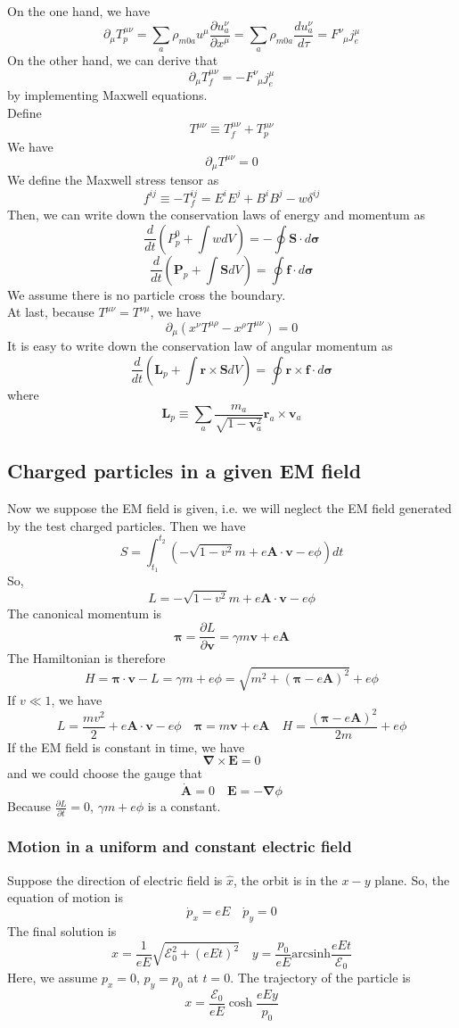 On the one hand, we have
\[\partial_{\mu} T_p^{\mu\nu} = \sum_a \rho_{m0a}u^{\mu} \frac{\partial u_a^{\nu}}{\partial x^{\mu}} = \sum_a \rho_{m0a} \frac{d u_a^{\nu}}{d \tau} = F^{\nu}_{\phantom{\nu}\mu}j_e^{\mu}\]
On the other hand, we can derive that
\[\partial_{\mu} T_f^{\mu\nu} = - F^{\nu}_{\phantom{\nu}\mu}j_e^{\mu}\]
by implementing Maxwell equations.
\\
Define
\[T^{\mu \nu} \equiv T_f^{\mu\nu} + T_p^{\mu\nu}\]
We have
\[\partial_{\mu} T^{\mu\nu} = 0\]
We define the Maxwell stress tensor as
\[f^{ij} \equiv -T_f^{ij} = E^{i}E^{j} + B^{i}B^{j} - w\delta^{ij}\]
Then, we can write down the conservation laws of energy and momentum as
\[\frac{d}{dt}\left(P_p^0 + \int w dV \right) = -\oint \bm{S}\cdot d\bm{\sigma}\]
\[\frac{d}{dt}\left(\bm{P}_p + \int \bm{S} dV \right) = \oint \bm{f}\cdot d\bm{\sigma}\]
We assume there is no particle cross the boundary.
\\
At last, because $T^{\mu\nu} = T^{\nu\mu}$, we have
\[\partial_{\mu}(x^{\nu}T^{\mu\rho}-x^{\rho}T^{\mu\nu}) = 0\]
It is easy to write down the conservation law of angular momentum as
\[\frac{d}{dt}\left(\bm{L}_p + \int \bm{r} \times \bm{S} dV \right) = \oint \bm{r} \times \bm{f}\cdot d\bm{\sigma}\]
where
\[\bm{L}_p \equiv \sum_a \frac{m_a}{\sqrt{1-\bm{v}_a^2}} \bm{r}_a  \times \bm{v}_a \]

\subsection{Charged particles in a given EM field}
Now we suppose the EM field is given, i.e. we will neglect the EM field generated by the test charged particles. Then we have
\[S = \int_{t_1}^{t_2} (-\sqrt{1-v^2}m + e\bm{A}\cdot\bm{v}-e\phi)dt\]
So,
\[L = -\sqrt{1-v^2}m + e\bm{A}\cdot\bm{v}-e\phi\]
The canonical momentum is
\[\bm{\pi} = \frac{\partial L}{\partial \bm{v}} = \gamma m \bm{v} + e \bm{A}\]
The Hamiltonian is therefore
\[H = \bm{\pi} \cdot \bm{v} - L = \gamma m + e \phi = \sqrt{m^2+(\bm{\pi}-e\bm{A})^2}+e\phi\]
If $v \ll 1$, we have
\[L = \frac{mv^2}{2} + e\bm{A}\cdot\bm{v}-e\phi \quad \bm{\pi} =  m \bm{v} + e \bm{A} \quad H = \frac{(\bm{\pi}-e\bm{A})^2}{2m}+e\phi\]
If the EM field is constant in time, we have
\[\bm{\nabla} \times \bm{E} = 0\]
and we could choose the gauge that
\[\dot{\bm{A}} = 0 \quad \bm{E} = -\bm{\nabla} \phi\]
Because $\frac{\partial L}{\partial t}=0$, $\gamma m + e\phi$ is a constant.

\subsubsection{Motion in a uniform and constant electric field}
Suppose the direction of electric field is  $\hat{x}$, the orbit is in the $x-y$ plane. So, the equation of motion is
\[\dot{p}_x = eE \quad \dot{p}_y = 0\]
The final solution is
\[x = \frac{1}{eE}\sqrt{\mathcal{E}_0^2 + (eEt)^2} \quad y = \frac{p_0}{eE} \mathrm{arcsinh} \frac{eEt}{\mathcal{E}_0}\]
Here, we assume $p_x = 0$, $p_y=p_0$ at $t = 0$.
The trajectory of the particle is
\[x = \frac{\mathcal{E}_0}{eE}\cosh \frac{eEy}{p_0}\]

